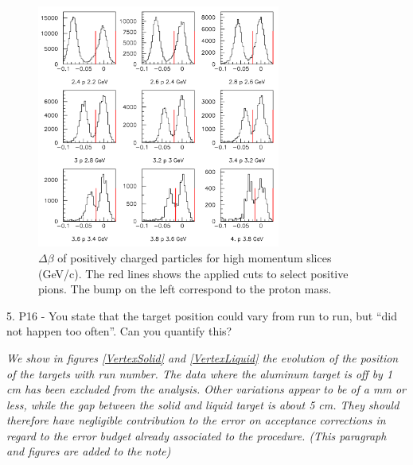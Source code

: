\documentclass[12pt]{article}
\begin{document}
\begin{figure}[tbp]
\centering
\includegraphics[width=8cm] {answer-fig/TofProfile3.png} 
\caption {$\Delta \beta$ of positively charged particles for high momentum slices 
(GeV/c). The red lines shows the applied cuts to select positive pions. The bump on the left
correspond to the proton mass.}
\label{TOF-3}
\end{figure}

5.
P16 - You state that the target position could vary from run to run, but “did not happen too 
often”.  Can you quantify this?  

{\it We show in figures \ref{VertexSolid} and \ref{VertexLiquid} the evolution 
of the position of the targets with run number. The data where the aluminum
target is off by 1 cm has been excluded from the analysis. Other variations
appear to be of a mm or less, while the gap between the solid and liquid target
is about 5 cm. They should therefore have negligible contribution to the 
error on acceptance corrections in regard to the error budget already associated
to the procedure. (This paragraph and figures are added to the note)}\\
\end{document}
